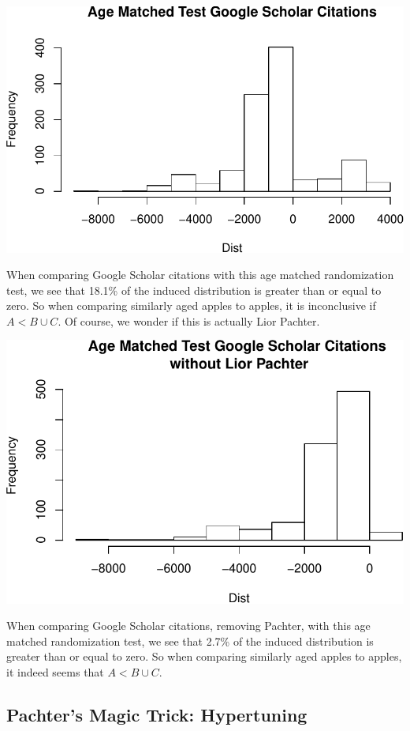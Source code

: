 \documentclass[]{article}
\begin{document}
\includegraphics{index_files/figure-latex/unnamed-chunk-38-1.pdf}

When comparing Google Scholar citations with this age matched
randomization test, we see that 18.1\% of the induced distribution is
greater than or equal to zero. So when comparing similarly aged apples
to apples, it is inconclusive if \(A < B\cup C\). Of course, we wonder
if this is actually Lior Pachter.

\includegraphics{index_files/figure-latex/unnamed-chunk-40-1.pdf}

When comparing Google Scholar citations, removing Pachter, with this age
matched randomization test, we see that 2.7\% of the induced
distribution is greater than or equal to zero. So when comparing
similarly aged apples to apples, it indeed seems that \(A < B\cup C\).

\hypertarget{pachters-magic-trick-hypertuning}{%
\subsection{Pachter's Magic Trick:
Hypertuning}\label{pachters-magic-trick-hypertuning}}
\end{document}
